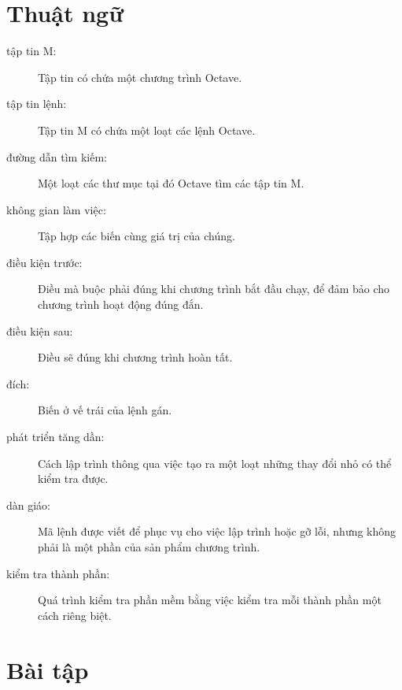 \documentclass[12pt]{book}
\begin{document}
\section{Thuật ngữ}

\begin{description}

\item[tập tin M:] Tập tin có chứa một chương trình Octave.

\item[tập tin lệnh:] Tập tin M có chứa một loạt các lệnh Octave.

\item[đường dẫn tìm kiếm:] Một loạt các thư mục tại đó Octave tìm các
tập tin M.

\item[không gian làm việc:] Tập hợp các biến cùng giá trị của chúng.

\item[điều kiện trước:] Điều mà buộc phải đúng khi chương trình bắt đầu
chạy, để đảm bảo cho chương trình hoạt động đúng đắn.

\item[điều kiện sau:] Điều sẽ đúng khi chương trình hoàn tất.

\item[đích:] Biến ở vế trái của lệnh gán.

\item[phát triển tăng dần:] Cách lập trình thông qua việc tạo ra một
loạt những thay đổi nhỏ có thể kiểm tra được.

\item[dàn giáo:] Mã lệnh được viết để phục vụ cho việc lập trình hoặc
gỡ lỗi, nhưng không phải là một phần của sản phẩm chương trình.

\item[kiểm tra thành phần:] Quá trình kiểm tra phần mềm bằng việc
kiểm tra mỗi thành phần một cách riêng biệt.

\end{description}


\section{Bài tập}
\end{document}
